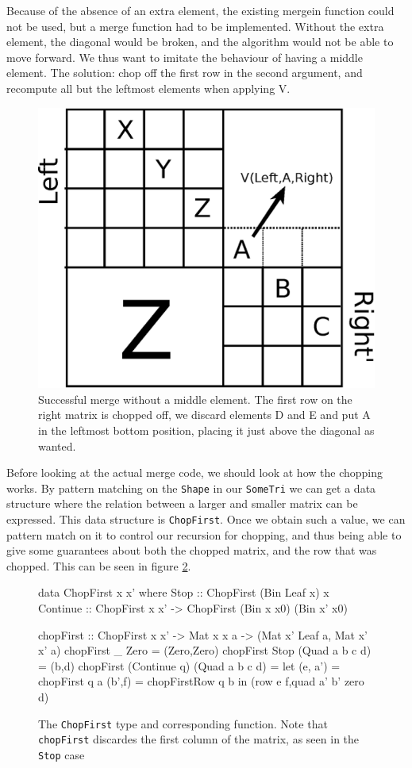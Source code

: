 \documentclass[a4paper,12pt,twosided]{report}
\begin{document}
Because of the absence of an extra element, the existing mergein function could
not be used, but a merge function had to be implemented. Without the extra
element, the diagonal would be broken, and the algorithm would not be able to
move forward. We thus want to imitate the behaviour of having a middle element.
The solution: chop off the first row in the second argument, and recompute all
but the leftmost elements when applying V. \label{chopsection}

\begin{figure}
\centering
\includegraphics[width=.5\textwidth]{merge-with-chopping.eps}
\caption{\label{chopmerge}Successful merge without a middle element. The first
row on the right matrix is chopped off, we discard elements D and E and put A in
the leftmost bottom position, placing it just above the diagonal as wanted.}
\end{figure}

Before looking at the actual merge code, we should look at how the chopping
works. By pattern matching on the \texttt{Shape} in our \texttt{SomeTri} we can
get a data structure where the relation between a larger and smaller matrix can
be expressed. This data structure is \texttt{ChopFirst}. Once we obtain such a
value, we can pattern match on it to control our recursion for chopping, and
thus being able to give some guarantees about both the chopped matrix, and the
row that was chopped. This can be seen in figure \ref{chopfirst}.

\begin{figure}[H]
\begin{code}
data ChopFirst x x' where
  Stop :: ChopFirst (Bin Leaf x) x
  Continue :: ChopFirst x x' -> ChopFirst (Bin x x0) (Bin x' x0)

chopFirst :: ChopFirst x x' -> Mat x x a  
                            -> (Mat x' Leaf a, Mat x' x' a)
chopFirst _ Zero = (Zero,Zero)
chopFirst Stop (Quad a b c d) = (b,d)
chopFirst (Continue q) (Quad a b c d) =
  let  (e, a') = chopFirst q a
       (b',f)  = chopFirstRow q b
  in (row e f,quad a' b' zero d)
\end{code}
\caption{\label{chopfirst} The \texttt{ChopFirst} type and corresponding
function. Note that \texttt{chopFirst} discardes the first column of the matrix, as seen
in the \texttt{Stop} case}
\end{figure}
\end{document}
